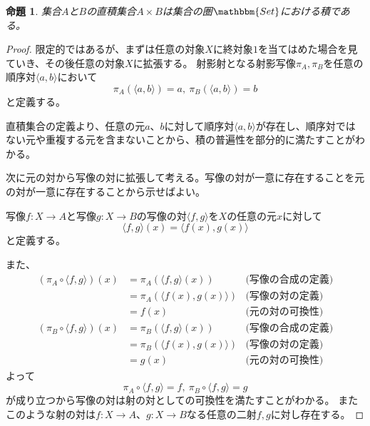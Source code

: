 \documentclass[dvipdfmx]{jsarticle}
\newcommand{\cat}[1]{\mathbbm{#1}}
\newcommand{\arrow}{\rightarrow}
\newcommand{\tuple}[1]{\langle #1\rangle}
\newcommand{\mor}[3]{#1:#2\arrow #3}
\newtheorem{proof}{証明}[section]
\newtheorem{prop}{命題}[section]
\numberwithin{proof}{subsection}
\numberwithin{prop}{subsection}
\numberwithin{define}{subsection}
\begin{document}
	\begin{prop}
	集合$A$と$B$の直積集合$A\times B$は集合の圏$\cat{Set}$における積である。
	\end{prop}
	\begin{proof}
		限定的ではあるが、まずは任意の対象$X$に終対象$1$を当てはめた場合を見ていき、その後任意の対象$X$に拡張する。
		射影射となる射影写像$\pi_A,\pi_B$を任意の順序対$\tuple{a,b}$において\[\pi_A(\tuple{a,b})=a,\ \pi_B(\tuple{a,b})=b\]と定義する。

		直積集合の定義より、任意の元$a$、$b$に対して順序対$\tuple{a,b}$が存在し、順序対ではない元や重複する元を含まないことから、積の普遍性を部分的に満たすことがわかる。
		\begin{center}
		\end{center}
		次に元の対から写像の対に拡張して考える。写像の対が一意に存在することを元の対が一意に存在することから示せばよい。

		写像$\mor{f}{X}{A}$と写像$\mor{g}{X}{B}$の写像の対$\tuple{f,g}$を$X$の任意の元$x$に対して\[\tuple{f,g}(x)=\tuple{f(x),g(x)}\]と定義する。

		また、
		\begin{align*}
			(\pi_A\circ\tuple{f,g})(x)&=\pi_A(\tuple{f,g}(x))&\text{(写像の合成の定義)}\\
			&=\pi_A(\tuple{f(x),g(x)})&\text{(写像の対の定義)}\\
			&=f(x)&\text{(元の対の可換性)}\\
			(\pi_B\circ\tuple{f,g})(x)&=\pi_B(\tuple{f,g}(x))&\text{(写像の合成の定義)}\\
			&=\pi_B(\tuple{f(x),g(x)})&\text{(写像の対の定義)}\\
			&=g(x)&\text{(元の対の可換性)}
		\end{align*}
		よって\[\pi_A\circ\tuple{f,g}=f,\ \pi_B\circ\tuple{f,g}=g\]が成り立つから写像の対は射の対としての可換性を満たすことがわかる。
		またこのような射の対は$\mor{f}{X}{A}$、$\mor{g}{X}{B}$なる任意の二射$f,g$に対し存在する。


\end{proof}
\end{document}

